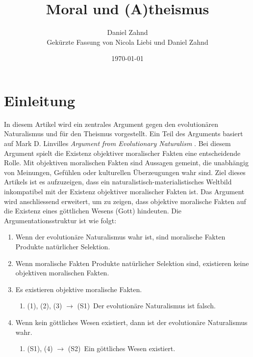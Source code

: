 \documentclass[11pt,a4paper]{article}
\title{Moral und (A)theismus}
\author{Daniel Zahnd\\ \small Gekürzte Fassung von Nicola Liebi und Daniel Zahnd}
\date{\today}
\begin{document}
	\maketitle
	
	\section{Einleitung}
	
	In diesem Artikel wird ein zentrales Argument gegen den evolutionären Naturalismus und für den Theismus vorgestellt. Ein Teil des Arguments basiert auf Mark D. Linvilles \textit{Argument from Evolutionary Naturalism} \cite{linville}. Bei diesem Argument spielt die Existenz objektiver moralischer Fakten eine entscheidende Rolle. Mit objektiven moralischen Fakten sind Aussagen gemeint, die unabhängig von Meinungen, Gefühlen oder kulturellen Überzeugungen wahr sind. Ziel dieses Artikels ist es aufzuzeigen, dass ein naturalistisch-materialistisches Weltbild inkompatibel mit der Existenz objektiver moralischer Fakten ist. Das Argument wird anschliessend erweitert, um zu zeigen, dass objektive moralische Fakten auf die Existenz eines göttlichen Wesens (Gott) hindeuten. Die Argumentationsstruktur ist wie folgt:
	
	\begin{tcolorbox}[title=Die vier Prämissen des Arguments]
		\begin{enumerate}[label=(\arabic*)]
			\item Wenn der evolutionäre Naturalismus wahr ist, sind moralische Fakten Produkte natürlicher Selektion.
			\item Wenn moralische Fakten Produkte natürlicher Selektion sind, existieren keine objektiven moralischen Fakten.
			\item Es existieren objektive moralische Fakten.
			\begin{enumerate}[label=(\arabic*)]
				\item[] (1), (2), (3) $\rightarrow$ (S1)$\,$ Der evolutionäre Naturalismus ist falsch.
			\end{enumerate}
			\item Wenn kein göttliches Wesen existiert, dann ist der evolutionäre Naturalismus wahr.
			\begin{enumerate}[label=(\arabic*)]
				\item[] (S1), (4) $\rightarrow$ (S2)$\,$ Ein göttliches Wesen existiert.
			\end{enumerate}
		\end{enumerate}
	\end{tcolorbox}
	
\end{document}
